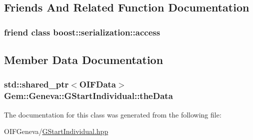 \subsection{Friends And Related Function Documentation}
\hypertarget{classGem_1_1Geneva_1_1GStartIndividual_ac98d07dd8f7b70e16ccb9a01abf56b9c}{
\subsubsection[{boost::serialization::access}]{\setlength{\rightskip}{0pt plus 5cm}friend class boost::serialization::access}}
\label{dd/d14/classGem_1_1Geneva_1_1GStartIndividual_ac98d07dd8f7b70e16ccb9a01abf56b9c}


\subsection{Member Data Documentation}
\hypertarget{classGem_1_1Geneva_1_1GStartIndividual_a38407e1c34927cd8675f7f289d20bead}{
\subsubsection[{theData}]{\setlength{\rightskip}{0pt plus 5cm}std::shared\_\-ptr$<${\bf OIFData}$>$ {\bf Gem::Geneva::GStartIndividual::theData}}}
\label{dd/d14/classGem_1_1Geneva_1_1GStartIndividual_a38407e1c34927cd8675f7f289d20bead}


The documentation for this class was generated from the following file:\begin{DoxyCompactItemize}
\item 
OIFGeneva/\hyperlink{GStartIndividual_8hpp}{GStartIndividual.hpp}\end{DoxyCompactItemize}

